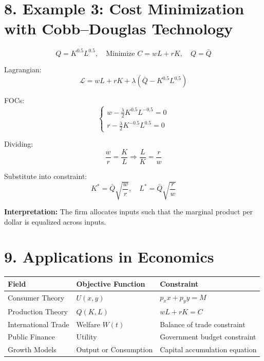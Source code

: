\documentclass[12pt]{article}
\begin{document}
\section*{8. Example 3: Cost Minimization with Cobb–Douglas Technology}

\[
Q = K^{0.5}L^{0.5}, \quad \text{Minimize } C = wL + rK, \quad Q = \bar{Q}
\]

Lagrangian:
\[
\mathcal{L} = wL + rK + \lambda(\bar{Q} - K^{0.5}L^{0.5})
\]

FOCs:
\[
\begin{cases}
w - \frac{\lambda}{2}K^{0.5}L^{-0.5} = 0 \\
r - \frac{\lambda}{2}K^{-0.5}L^{0.5} = 0
\end{cases}
\]

Dividing:
\[
\frac{w}{r} = \frac{K}{L} \Rightarrow \frac{L}{K} = \frac{r}{w}
\]

Substitute into constraint:
\[
K^* = \bar{Q}\sqrt{\frac{w}{r}}, \quad L^* = \bar{Q}\sqrt{\frac{r}{w}}
\]

\textbf{Interpretation:} The firm allocates inputs such that the marginal product per dollar is equalized across inputs.

\section*{9. Applications in Economics}

\begin{center}
\begin{tabular}{l|l|l}
\textbf{Field} & \textbf{Objective Function} & \textbf{Constraint} \\ \hline
Consumer Theory & $U(x,y)$ & $p_xx + p_yy = M$ \\
Production Theory & $Q(K,L)$ & $wL + rK = C$ \\
International Trade & Welfare $W(t)$ & Balance of trade constraint \\
Public Finance & Utility & Government budget constraint \\
Growth Models & Output or Consumption & Capital accumulation equation
\end{tabular}
\end{center}
\end{document}
